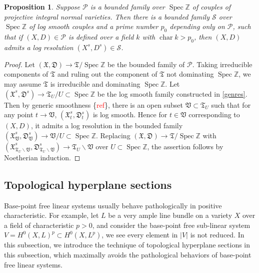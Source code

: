 \documentclass[letterpaper,reqno,12pt]{amsart}
\DeclareMathOperator{\Spec}{Spec}
\DeclareMathOperator{\chara}{char}
\newcommand{\red}{\textcolor{red}}
\numberwithin{equation}{section}
\theoremstyle{plain}
\newtheorem{proposition}[theorem]{Proposition}
\begin{document}
\begin{proposition}\label{genres1}
    Suppose $\mathcal P$ is a bounded family over $\Spec\mathbb Z$ of couples of projective integral normal varieties. Then there is a bounded family $\mathcal S$ over $\Spec \mathbb Z$ of log smooth couples and a prime number $p_0$ depending only on $\mathcal P$, such that if $(X,D)\in \mathcal P$ is defined over a field $k$ with $\chara k>p_0$, then $(X,D)$ admits a log resolution $(X^s,D^s)\in\mathcal S$.
\end{proposition}
\begin{proof}
    Let $(\mathfrak X,\mathfrak D)\to \mathfrak T/\Spec \mathbb Z$ be the bounded family of $\mathcal P$. Taking irreducible components of $\mathfrak T$ and ruling out the component of $\mathfrak T$ not dominating $\Spec \mathbb Z$, we may assume $\mathfrak T$ is irreducible and dominating $\Spec\mathbb Z$. Let $(\mathfrak X^s,\mathfrak D^s)\to \mathfrak T_U/U\subset\Spec\mathbb Z$ be the log smooth family constructed in \ref{genres}.   Then by generic smoothness \{\red{ref}\}, there is an open subset $\mathfrak V\subset \mathfrak T_U$ such that for any point $t\to \mathfrak V$, $(\mathfrak X^s_t,\mathfrak D^s_t)$ is log smooth. Hence for $t\in \mathfrak V$ corresponding to $(X,D)$, it admits a log resolution in the bounded family $(\mathfrak X^s_\mathfrak V,\mathfrak D^s_\mathfrak V)\to \mathfrak V/U\subset \Spec\mathbb Z$. Replacing $(\mathfrak X,\mathfrak D)\to \mathfrak T/\Spec \mathbb Z$ with $(\mathfrak X^s_{\mathfrak T_U\backslash\mathfrak V},\mathfrak D^s_{\mathfrak T_U\backslash\mathfrak V})\to  \mathfrak {T}_U\backslash\mathfrak V$ over $U\subset \Spec\mathbb Z$, the assertion follows by Noetherian induction.
\end{proof}

\subsection{Topological hyperplane sections}
Base-point free linear systems usually behave pathologically in positive characteristic. For example, let $L$ be a very ample line bundle on a variety $X$ over a field of characteristic $p>0$, and consider the base-point free sub-linear system $V=H^0(X,L)^p\subset H^0(X,L^p)$, we see every element in $|V|$ is not reduced. In this subsection, we introduce the technique of topological hyperplane sections in this subsection, which maximally avoids the pathological behaviors of base-point free linear systems.  
\end{document}

